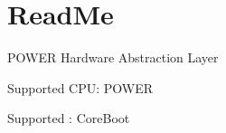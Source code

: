 \chapter{Read\+Me}
\hypertarget{md_dev_2_kernel_2_h_a_l_kit_2_p_o_w_e_r_2_read_me}{}\label{md_dev_2_kernel_2_h_a_l_kit_2_p_o_w_e_r_2_read_me}
POWER Hardware Abstraction Layer


\begin{DoxyItemize}
\item Supported CPU\+: POWER
\item Supported \+: Core\+Boot 
\end{DoxyItemize}